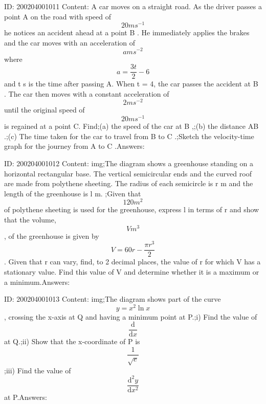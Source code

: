 \documentclass{article}
\begin{document}
ID: 200204001011
Content:
A car moves on a straight road. As the driver passes a point A on the road with speed of $$20ms^{-1}$$ he notices an accident ahead at a point B . He immediately applies the brakes and the car moves with an acceleration of $$a ms^{-2}$$ where $$a=\frac{3t }{2}-6$$ and t s is the time after passing A. When t = 4, the car passes the accident at B . The car then moves with a constant acceleration of $$2 ms^{-2}$$ until the original speed of $$20ms^{-1}$$ is regained at a point C. Find;(a)	the speed of the car at B ,;(b)	the distance AB .;(c)	The time taken for the car to travel from B to C .;Sketch the velocity-time graph for the journey from A to C .Answers:

ID: 200204001012
Content:
img;The diagram shows a greenhouse standing on a horizontal rectangular base. The vertical semicircular ends and the curved roof are made from polythene sheeting. The radius of each semicircle is r m and the length of the greenhouse is l m. ;Given that $$120m^2$$ of polythene sheeting is used for the greenhouse, express l in terms of r and show that the volume, $$V m^3$$, of the greenhouse is given by $$V=60r-\frac{\pi r^{3}}{2}$$. Given that r can vary, find, to 2 decimal places, the value of r for which V has a stationary value. Find this value of V and determine whether it is a maximum or a minimum.Answers:

ID: 200204001013
Content:
img;The diagram shows part of the curve $$y=x^2\ln x$$, crossing the x-axis at Q and having a minimum point at P.;i)	Find the value of $$\frac{\mathrm{d} }{\mathrm{d} x}$$ at Q.;ii)	Show that the x-coordinate of P is $$\frac{1}{\sqrt{e}}$$;iii)	Find the value of $$\frac{\mathrm{d} ^{2}y}{\mathrm{d} x^{2}}$$ at P.Answers:
\end{document}
